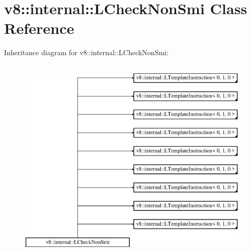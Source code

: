 \hypertarget{classv8_1_1internal_1_1_l_check_non_smi}{}\section{v8\+:\+:internal\+:\+:L\+Check\+Non\+Smi Class Reference}
\label{classv8_1_1internal_1_1_l_check_non_smi}
Inheritance diagram for v8\+:\+:internal\+:\+:L\+Check\+Non\+Smi\+:\begin{figure}[H]
\begin{center}
\leavevmode
\includegraphics[height=10.000000cm]{classv8_1_1internal_1_1_l_check_non_smi}
\end{center}
\end{figure}
